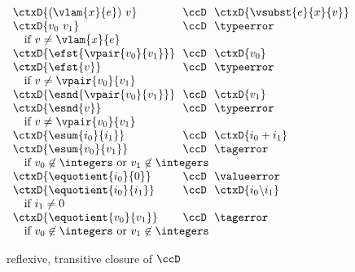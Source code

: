 \begin{flushleft}
\begin{minipage}[t]{\columnwidth}
\begin{mathpar}
\end{mathpar}
\end{minipage}

\begin{minipage}[b]{\columnwidth}
\\
$\begin{array}{l@{~~}c@{~~}l}
  \ctxD{(\vlam{x}{e})~v} & \ccD & \ctxD{\vsubst{e}{x}{v}}
\\
  \ctxD{v_0~v_1} & \ccD & \typeerror
\\ \multicolumn{3}{l}{\mbox{\quad if $v \neq \vlam{x}{e}$}}
\\
  \ctxD{\efst{\vpair{v_0}{v_1}}} & \ccD & \ctxD{v_0}
\\
  \ctxD{\efst{v}} & \ccD & \typeerror
\\ \multicolumn{3}{l}{\mbox{\quad if $v \neq \vpair{v_0}{v_1}$}}
\\
  \ctxD{\esnd{\vpair{v_0}{v_1}}} & \ccD & \ctxD{v_1}
\\
  \ctxD{\esnd{v}} & \ccD & \typeerror
\\ \multicolumn{3}{l}{\mbox{\quad if $v \neq \vpair{v_0}{v_1}$}}
\\
  \ctxD{\esum{i_0}{i_1}} & \ccD & \ctxD{i_0 + i_1}
\\
  \ctxD{\esum{v_0}{v_1}} & \ccD & \tagerror
\\ \multicolumn{3}{l}{\mbox{\quad if $v_0 \not\in \integers$ or $v_1 \not\in \integers$}}
\\
  \ctxD{\equotient{i_0}{0}} & \ccD & \valueerror
\\
  \ctxD{\equotient{i_0}{i_1}} & \ccD & \ctxD{i_0 \backslash i_1}
\\ \multicolumn{3}{l}{\mbox{\quad if $i_1 \neq 0$}}
\\
  \ctxD{\equotient{v_0}{v_1}} & \ccD & \tagerror
\\ \multicolumn{3}{l}{\mbox{\quad if $v_0 \not\in \integers$ or $v_1 \not\in \integers$}}
\end{array}$

\medskip
{} reflexive, transitive closure of $\ccD$


\end{minipage}
\end{flushleft}
